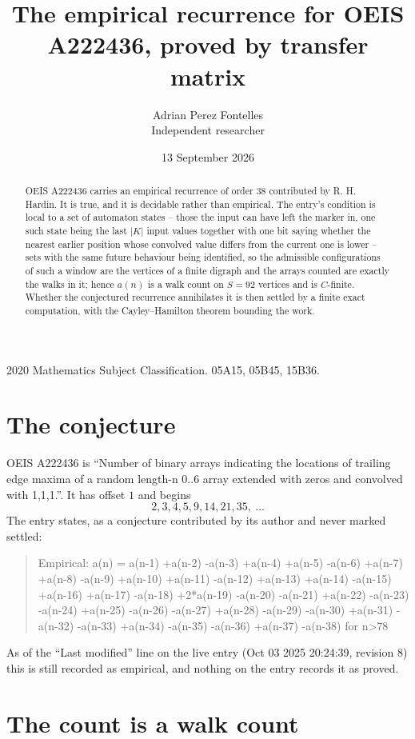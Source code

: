 \documentclass[11pt,a4paper]{article}
\title{The empirical recurrence for OEIS A222436, proved by transfer matrix}
\author{Adrian Perez Fontelles\\ \small Independent researcher}
\date{13 September 2026}
\theoremstyle{plain}
\theoremstyle{definition}
\begin{document}
\maketitle

\begin{abstract}
OEIS A222436 carries an empirical recurrence of order $38$ contributed by R. H. Hardin. It is
true, and it is decidable rather than empirical. The entry's condition is local to a set of automaton states -- those the input can have left the marker in, one such state being the last $|K|$ input values together with one bit saying whether the nearest earlier position whose convolved value differs from the current one is lower -- sets with the same future behaviour being identified, so
the admissible configurations of such a window are the vertices of a finite digraph and the
arrays counted are exactly the walks in it; hence $a(n)$ is a walk count on $S=92$ vertices
and is $C$-finite. Whether the conjectured recurrence annihilates it is then settled by a
finite exact computation, with the Cayley--Hamilton theorem bounding the work.
\end{abstract}

\noindent\small 2020 Mathematics Subject Classification. 05A15, 05B45, 15B36.\normalsize

\section{The conjecture}

OEIS A222436 is ``Number of binary arrays indicating the locations of trailing edge maxima of a random length-n 0..6 array extended with zeros and convolved with 1,1,1.''. It has offset $1$ and begins
\[
2, 3, 4, 5, 9, 14, 21, 35,\ \dots
\]
The entry states, as a conjecture contributed by its author and never marked settled:
\begin{quote}
Empirical: a(n) = a(n-1) +a(n-2) -a(n-3) +a(n-4) +a(n-5) -a(n-6) +a(n-7) +a(n-8) -a(n-9) +a(n-10) +a(n-11) -a(n-12) +a(n-13) +a(n-14) -a(n-15) +a(n-16) +a(n-17) -a(n-18) +2*a(n-19) -a(n-20) -a(n-21) +a(n-22) -a(n-23) -a(n-24) +a(n-25) -a(n-26) -a(n-27) +a(n-28) -a(n-29) -a(n-30) +a(n-31) -a(n-32) -a(n-33) +a(n-34) -a(n-35) -a(n-36) +a(n-37) -a(n-38) for n>78
\end{quote}
As of the ``Last modified'' line on the live entry (Oct 03 2025 20:24:39, revision 8) this is still
recorded as empirical, and nothing on the entry records it as proved.

\section{The count is a walk count}
\end{document}
